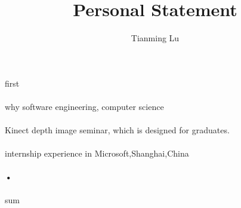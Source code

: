 \documentclass{article}
\title{Personal Statement}
\author{Tianming Lu}
\begin{document}
\maketitle
\paragraph{}
first
\paragraph{}
why software engineering, computer science 
\paragraph{}
Kinect depth image seminar, which is designed for graduates.
\paragraph{}
internship experience in Microsoft,Shanghai,China
\paragraph{•}
sum
\end{document}
